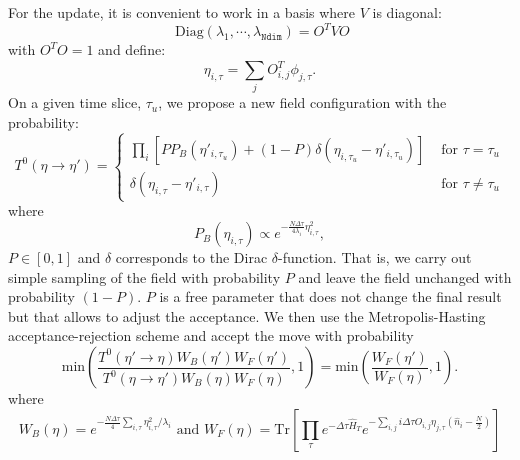 For the update, it is convenient to  work in a basis where  $V$   is diagonal: 
\begin{equation}
	\text{ Diag}  \left( \lambda_1, \cdots ,\lambda_{\texttt{Ndim}} \right)    =  O^{T} V O 
\end{equation}
 with $O^T O = 1$  and define:
 \begin{equation}
 	  \eta_{i,\tau}^{\phantom\dagger}   =  \sum_{j} O^{T}_{i,j} \phi_{j,\tau}^{\phantom\dagger}.
 \end{equation}
 On a given time slice, $\tau_u$, we propose a  new field configuration with the probability: 
 \begin{equation}
 	T^{0} ( \eta  \rightarrow  \eta' ) = 
	\left\{ 
	\begin{array}{ll} 
	  \prod_{i} \left[  P P_B(\eta'_{i,\tau_u})  + (1-P) \delta( \eta_{i,\tau_u} - \eta'_{i,\tau_u})   \right]  & \text{  for  } \tau = \tau_u \\
	  \delta( \eta_{i,\tau} - \eta'_{i,\tau})   & \text{  for  } \tau \neq \tau_u 
	  \end{array}
	  \right.
 \end{equation}
 where 
 \begin{equation}
 	 P_B(\eta_{i,\tau})   \propto e^{ - \frac{N \Delta \tau} {4 \lambda_i}  \eta_{i,\tau}^2 },
 \end{equation}
$ P \in \left[0,1 \right] $ and $\delta $  corresponds to  the Dirac $\delta$-function.    That is, we  carry out  simple sampling of the field with probability $P$  and leave the field unchanged with probability 
$(1-P)$.  $P$ is a free parameter that   does not change the final result but that allows to adjust the acceptance.    We then use  the Metropolis-Hasting    acceptance-rejection  scheme   and accept the move  with probability 
\begin{equation}
   \text{min} \left(     \frac{T^{0} ( \eta'  \rightarrow \eta ) W_B(\eta') W_F(\eta')  }{ T^{0} ( \eta \rightarrow \eta' ) W_B(\eta) W_F(\eta) } , 1 \right)     = \text{min} \left(     \frac{W_F(\eta')  }{ W_F(\eta) } , 1 \right) . 
\end{equation}
where 
\begin{equation}
  W_B(\eta)  = e^{ - \frac{N \Delta \tau} {4 } \sum_{i,\tau} \eta_{i,\tau}^2/\lambda_i } 
  \text{   and   } 
  W_F(\eta)  = \text{Tr} \left[   \prod_{\tau}   
     e^{-\Delta \tau \hat{H}_T}  e^{- \sum_{i,j}  i \Delta \tau O_{i,j}\eta_{j,\tau} \left( \hat{n}_{i} - \frac{N}{2} \right) }\right]
\end{equation}


